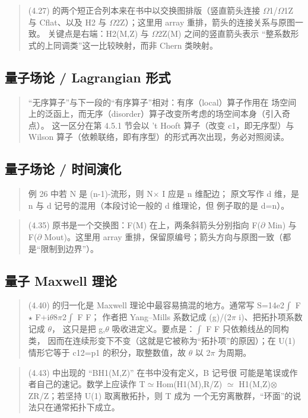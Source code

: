 \begin{quote}\small
(4.27) 的两个短正合列本来在书中以交换图排版（竖直箭头连接 $\Omega$1/$\Omega$1Z 与 Cflat、以及 H2 与 $\Omega$2Z）；这里用 array 重排，箭头的连接关系与原图一致。 关键点是右端：H2(M,Z) 与 $\Omega$2Z(M) 之间的竖直箭头表示 “整系数形式的上同调类”这一比较映射，而非 Chern 类映射。
\end{quote}

\subsection*{量子场论 / Lagrangian 形式}
\begin{quote}\small
“无序算子”与下一段的“有序算子”相对：有序（local）算子作用在 场空间上的泛函上，而无序（disorder）算子改变所考虑的场空间本身（引入奇点）。 这一区分在第 4.5.1 节会以 't Hooft 算子（改变 c1，即无序型）与 Wilson 算子（依赖联络，即有序型）的形式再次出现，务必对照阅读。
\end{quote}

\subsection*{量子场论 / 时间演化}
\begin{quote}\small
例 26 中若 N 是 (n-1)-流形，则 N$\times$ I 应是 n 维配边； 原文写作 d 维，是 n 与 d 记号的混用（本段讨论一般的 d 维理论，但 例子取的是 d=n）。
\end{quote}

\begin{quote}\small
(4.35) 原书是一个交换图：F(M) 在上，两条斜箭头分别指向 F($\partial$ Min) 与 F($\partial$ Mout)。这里用 array 重排，保留原编号；箭头方向与原图一致（都是“限制到边界”）。
\end{quote}

\subsection*{量子 Maxwell 理论}
\begin{quote}\small
(4.40) 的归一化是 Maxwell 理论中最容易搞混的地方。通常写 S=14e2$\int$ F$\star$ F+i$\theta$8$\pi$2$\int$ F F； 作者把 Yang--Mills 系数记成 (g)/(2$\pi$ i)、把拓扑项系数记成 $\theta$， 这只是把 g,$\theta$ 吸收进定义。要点是：$\int$ F F 只依赖线丛的同构类， 因而在连续形变下不变（这就是它被称为“拓扑项”的原因）；在 U(1) 情形它等于 c12=p1 的积分，取整数值，故 $\theta$ 以 2$\pi$ 为周期。
\end{quote}

\begin{quote}\small
(4.43) 中出现的 “BH1(M,Z)” 在书中没有定义，B 记号很 可能是笔误或作者自己的速记。数学上应读作 T$\simeq$Hom(H1(M),R/Z) $\simeq$ H1(M,Z)$\otimes$ZR/Z；若坚持 U(1) 取离散拓扑，则 T 成为 一个无穷离散群，“环面”的说法只在通常拓扑下成立。
\end{quote}


